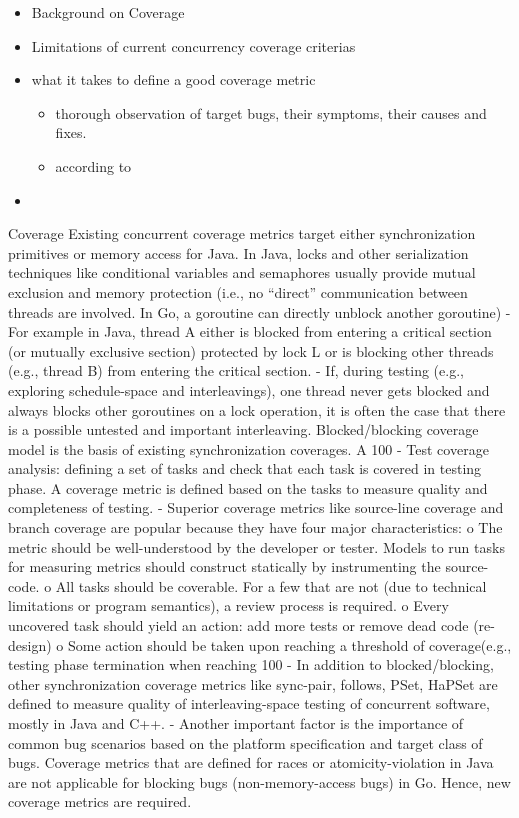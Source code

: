 \begin{itemize}
  \item Background on Coverage
  \item Limitations of current concurrency coverage criterias
  \item what it takes to define a good coverage metric
  \begin{itemize}
    \item thorough observation of target bugs, their symptoms, their causes and fixes.
    \item according to \cite{}
  \end{itemize}
  \item
\end{itemize}
Coverage
Existing concurrent coverage metrics target either synchronization primitives or memory access for Java. In Java, locks and other serialization techniques like conditional variables and semaphores usually provide mutual exclusion and memory protection (i.e., no “direct” communication between threads are involved. In Go, a goroutine can directly unblock another goroutine)
-	For example in Java,  thread A either is blocked from entering a critical section (or mutually exclusive section) protected by lock L or is blocking other threads (e.g., thread B) from entering the critical section.
-	If, during testing (e.g., exploring schedule-space and interleavings), one thread never gets blocked and always blocks other goroutines on a lock operation, it is often the case that there is a possible untested and important interleaving. Blocked/blocking coverage model is the basis of existing synchronization coverages. A 100%
-	Test coverage analysis: defining a set of tasks and check that each task is covered in testing phase. A coverage metric is defined based on the tasks to measure quality and completeness of testing.
-	Superior coverage metrics like source-line coverage and branch coverage are popular because they have four major characteristics:
o	The metric should be well-understood by the developer or tester. Models to run tasks for measuring metrics should construct statically by instrumenting the source-code.
o	All tasks should be coverable. For a few that are not (due to technical limitations or program semantics), a review process is required.
o	Every uncovered task should yield an action: add more tests or remove dead code (re-design)
o	Some action should be taken upon reaching a threshold of coverage(e.g., testing phase termination when reaching 100%
-	In addition to blocked/blocking, other synchronization coverage metrics like sync-pair, follows, PSet, HaPSet are defined to measure quality of interleaving-space testing of concurrent software, mostly in Java and C++.
-	Another important factor is the importance of common bug scenarios based on the platform specification and target class of bugs. Coverage metrics that are defined for races or atomicity-violation in Java are not applicable for blocking bugs (non-memory-access bugs) in Go. Hence, new coverage metrics are required.

